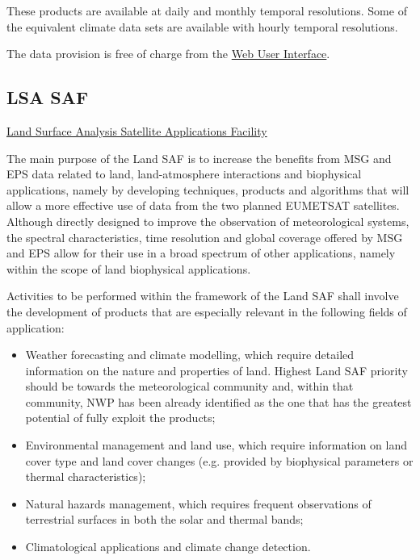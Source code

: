 \documentclass[11pt]{article}
\begin{document}
These products are available at daily and monthly temporal
resolutions. Some of the equivalent climate data sets are
available with hourly temporal resolutions.

The data provision is free of charge from the \href{http://wui.cmsaf.eu/}{Web User Interface}.

\subsection{LSA SAF}
\label{sec-1-8}

\href{http://landsaf.meteo.pt/}{Land Surface Analysis Satellite Applications Facility}

The main purpose of the Land SAF is to increase the benefits from
MSG and EPS data related to land, land-atmosphere interactions and
biophysical applications, namely by developing techniques,
products and algorithms that will allow a more effective use of
data from the two planned EUMETSAT satellites.  Although directly
designed to improve the observation of meteorological systems, the
spectral characteristics, time resolution and global coverage
offered by MSG and EPS allow for their use in a broad spectrum of
other applications, namely within the scope of land biophysical
applications.

Activities to be performed within the framework of the Land SAF
shall involve the development of products that are especially
relevant in the following fields of application:

\begin{itemize}
\item Weather forecasting and climate modelling, which require
detailed information on the nature and properties of
land. Highest Land SAF priority should be towards the
meteorological community and, within that community, NWP has
been already identified as the one that has the greatest
potential of fully exploit the products;
\item Environmental management and land use, which require information
on land cover type and land cover changes (e.g. provided by
biophysical parameters or thermal characteristics);
\item Natural hazards management, which requires frequent observations
of terrestrial surfaces in both the solar and thermal bands;
\item Climatological applications and climate change detection.
\end{itemize}
\end{document}
